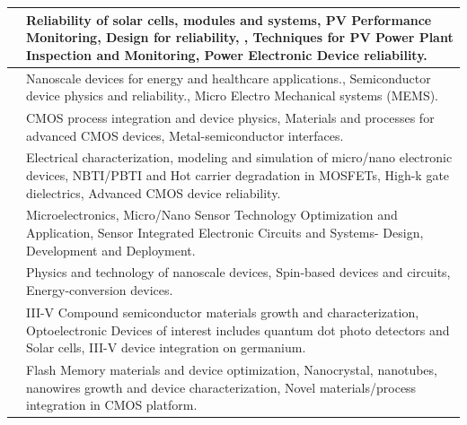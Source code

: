 \documentclass[openany]{book} %
\begin{document}
\begin{tabular}{p{4.5cm} p{9cm}}
\href{https://www.ee.iitb.ac.in/web/people/faculty/home/naren}{\color{blue}{Prof. Narendra Sudhir Shiradkar}} & Reliability of solar cells, modules and systems, PV Performance Monitoring, Design for reliability, , Techniques for PV Power Plant Inspection and Monitoring, Power Electronic Device reliability.\\
\hline

\href{https://www.ee.iitb.ac.in/web/people/faculty/home/prnair}{\color{blue}{Prof. Pradeep R. Nair}} & Nanoscale devices for energy and healthcare applications., Semiconductor device physics and reliability., Micro Electro Mechanical systems (MEMS).\\
\hline

\href{https://www.ee.iitb.ac.in/web/people/faculty/home/slodha}{\color{blue}{Prof. Saurabh Lodha}} & CMOS process integration and device physics, Materials and processes for advanced CMOS devices, Metal-semiconductor interfaces.\\
\hline

\href{https://www.ee.iitb.ac.in/web/people/faculty/home/souvik}{\color{blue}{Prof. Souvik Mahapatra}} & Electrical characterization, modeling and simulation of micro/nano electronic devices, NBTI/PBTI and Hot carrier degradation in MOSFETs, High-k gate dielectrics, Advanced CMOS device reliability.\\
\hline

\href{https://www.ee.iitb.ac.in/web/people/faculty/home/sdgupta}{\color{blue}{Prof. Siddhartha P. Duttagupta}} & Microelectronics, Micro/Nano Sensor Technology Optimization and Application, Sensor Integrated Electronic Circuits and Systems- Design, Development and Deployment.
\\
\hline

\href{https://www.ee.iitb.ac.in/web/people/faculty/home/sganguly}{\color{blue}{Prof. Swaroop Ganguly}} & Physics and technology of nanoscale devices, Spin-based devices and circuits, Energy-conversion devices.\\
\hline

\href{https://www.ee.iitb.ac.in/web/people/faculty/home/subho}{\color{blue}{Prof. Subhananda Chakrabarti}} & III-V Compound semiconductor materials growth and characterization, Optoelectronic Devices of interest includes quantum dot photo detectors and Solar cells, III-V device integration on germanium.\\ 
\hline

\href{https://www.ee.iitb.ac.in/web/people/faculty/home/udayan}{\color{blue}{Prof. Udayan Ganguly}} & Flash Memory materials and device optimization, Nanocrystal, nanotubes, nanowires growth and device characterization, Novel materials/process integration in CMOS platform.\\
\hline

\end{tabular}
\end{document}
